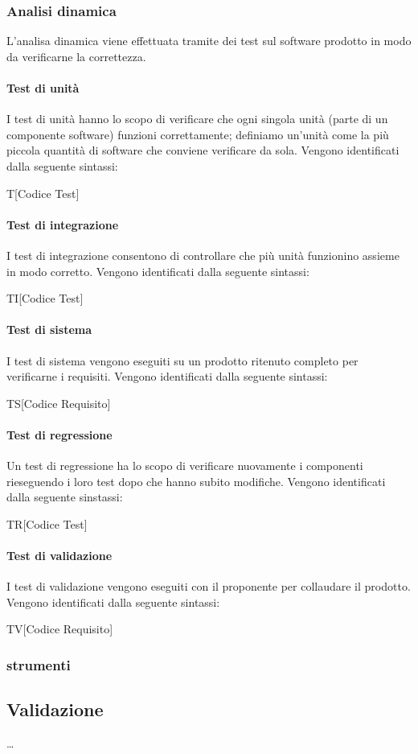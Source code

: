 	\subsubsection{Analisi dinamica}
	L'analisa dinamica viene effettuata tramite dei test sul software prodotto in modo da verificarne la correttezza.
	\paragraph{Test di unità}
		I test di unità hanno lo scopo di verificare che ogni singola unità (parte di un componente software) funzioni correttamente; definiamo un'unità come la più piccola quantità di software che conviene verificare da sola.
		Vengono identificati dalla seguente sintassi:
		\centerline{T[Codice Test]}
	\paragraph{Test di integrazione}
		I test di integrazione consentono di controllare che più unità funzionino assieme in modo corretto.
		Vengono identificati dalla seguente sintassi:
		\centerline{TI[Codice Test]}
	\paragraph{Test di sistema}
		I test di sistema vengono eseguiti su un prodotto ritenuto completo per verificarne i requisiti.
		Vengono identificati dalla seguente sintassi:
		\centerline{TS[Codice Requisito]}
	\paragraph{Test di regressione}
		Un test di regressione ha lo scopo di verificare nuovamente i componenti rieseguendo i loro test dopo che hanno subito modifiche.
		Vengono identificati dalla seguente sinstassi:
		\centerline{TR[Codice Test]}
	\paragraph{Test di validazione}
		I test di validazione vengono eseguiti con il proponente per collaudare il prodotto.
		Vengono identificati dalla seguente sintassi:
		\centerline{TV[Codice Requisito]}
 \subsubsection{strumenti}

\subsection{Validazione} \dots



